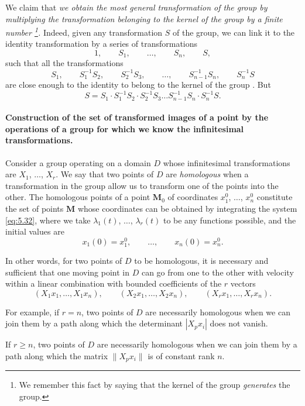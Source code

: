 We claim that \emph{we obtain the most general transformation of the group by multiplying the transformation belonging to the kernel of the group by a finite number \footnote{We remember this fact by saying that the kernel of the group \emph{generates} the group.}.} Indeed, given any transformation $S$ of the group, we can link it to the identity transformation by a series of transformations
\[
1,\qquad S_{1},\qquad \dots,\qquad S_{n},\qquad S,
\]
such that all the transformations
\[
S_{1},\qquad S_{1}^{-1}S_{2},\qquad S_{2}^{-1}S_{3},\qquad \dots,\qquad S_{n-1}^{-1}S_{n},\qquad S_{n}^{-1}S
\]
are close enough to the identity to belong to the kernel of the group \cite{15}. But
\[
S=S_{1}\cdot S_{1}^{-1}S_{2}\cdot S_{2}^{-1}S_{3}\dots S_{n-1}^{-1}S_{n}\cdot S_{n}^{-1}S.
\]

\paragraph{Construction of the set of transformed images of a point by the operations of a group for which we know the infinitesimal transformations.}
\label{sec:87}
Consider a group operating on a domain $D$ whose infinitesimal transformations are $X_{1}$, $\dots$, $X_{r}$. We say that two points of $D$ are \emph{homologous} when a transformation in the group allow us to transform one of the points into the other. The homologous points of a point $\mathbf{M}_{0}$ of coordinates $x_{1}^{0}$, $\dots$, $x_{n}^{0}$ constitute the set of points $\mathbf{M}$ whose coordinates can be obtained by integrating the system \eqref{eq:5.32}, where we take $\lambda_{1}(t)$, $\dots$, $\lambda_{r}(t)$ to be any functions possible, and the initial values are
\[
x_{1}(0)=x_{1}^{0},\qquad\dots,\qquad x_{n}(0)=x_{n}^{0}.
\]

In other words, for two points of $D$ to be homologous, it is necessary and sufficient that one moving point in $D$ can go from one to the other with velocity within a linear combination with bounded coefficients of the $r$ vectors
\begin{equation}
  \label{eq:5.34}
  (X_{1}x_{1},\dots,X_{1}x_{n}),\qquad(X_{2}x_{1},\dots,X_{2}x_{n}),\qquad(X_{r}x_{1},\dots,X_{r}x_{n}).
\end{equation}

For example, if $r=n$, two points of $D$ are necessarily homologous when we can join them by a path along which the determinant $|X_{p}x_{i}|$ does not vanish.

If $r\ge n$, two points of $D$ are necessarily homologous when we can join them by a path along which the matrix $\|X_{p}x_{i}\|$ is of constant rank $n$.

